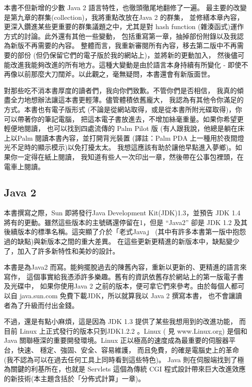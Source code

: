 本書不但新增的少數 Java 2 語言特性，也徹頭徹尾地翻修了一遍。
最主要的改變是第九章的群集(collection)，我將重點改放在Java 2 的群集，
並修繕本章內容，更深入鑽進某些更重要的群集議題之中，尤其是對 hash function
(雜湊函式)運作方式的討論。此外還有其他一些變動，
包括重寫第一章，抽掉部份附錄以及我認為新版不再需要的內容。
整體而言，我重新審閱所有內容，移去第二版中不再需要的部份
(但仍保留它們的電子版於我的網站上)，並將新的更動加入，
然後儘可能改進我能夠改進的所有地方。這種大變動是由於語言本身持續有所變化 -
即使不再像以前那麼大刀闊斧。以此觀之，毫無疑問，本書還會有新版面世。

對那些吃不消本書厚度的讀者們，我向你們致歉。不管你們是否相信，
我真的傾盡全力地想辦法讓這本書更輕薄。儘管體積依舊龐大，
我認為有其他令你滿足的方式。本書也有電子版形式
(不論是從網站取得，或是從本書所附光碟取得)，你可以帶著你的筆記電腦，
把這本電子書放進去，不增加絲毫重量。如果你希望更輕便地閱讀，
也可以找到四處流傳的 Palm Pilot 版
(有人跟我說，他總是躺在床上以Palm 閱讀本書內容，並打開背光裝置
(譯註：Palm PDA 上一種用於夜間燈光不足時的顯示模示)以免打擾太太。
我想這應該有助於讓他早點進入夢鄉)。如果你一定得在紙上閱讀，
我知道有些人一次印出一章，然後帶在公事包裡頭，在電車上閱讀。
\subsection{Java 2}
本書撰寫之際，Sun 即將發行Java Development Kit(JDK)1.3，並預告 JDK 1.4
將有的更動。雖然這些版本的主號碼還停留在1，但是 ``Java2'' 卻是
JDK 1.2 及其後續版本的標準名稱。這突顯了介於「老式Java」
(其中有許多本書第一版中抱怨過的缺點)與新版本之間的重大差異。
在這些更新更精進的新版本中，缺點變少了，加入了許多新特性和美妙的設計。

本書是為Java2 而寫。能夠擺脫過去的陳舊內容，重新以更新的、更精進的語言來寫作，
這個事實給我憑添許多樂趣。舊有的資訊依舊存於網站上的第一版電子書及光碟中，
如果你使用Java 2 之前的版本，便可拿它們來參考。由於每個人都可以自
java.sun.com 免費下載JDK，所以就算我以 Java 2 撰寫本書，
也不會讓讀者為了升級而付出金錢。

不過，還是有點小麻煩，這是因為 JDK 1.3 提供了某些我想用到的改進功能，
而目前 Linux 上正式發行的版本只到JDK1.2.2 。Linux ( 見 www.Linux.org) 是個和
Java 關聯極深的重要開發環境。Linux 正以極高的速度成為最重要的伺服器平台，快速、
穩定、強固、安全、容易維護， 而且免費，的確是電腦史上的革命
(我不認為可以在過去任何工具上同時看到這些特色)。 Java
則在伺服端找到了極為關鍵的利基所在，也就是 Servlets 這個為傳統 CGI
程式設計帶來巨大改進效應的新技術(本主題含括於「分佈式計算」一章)。

